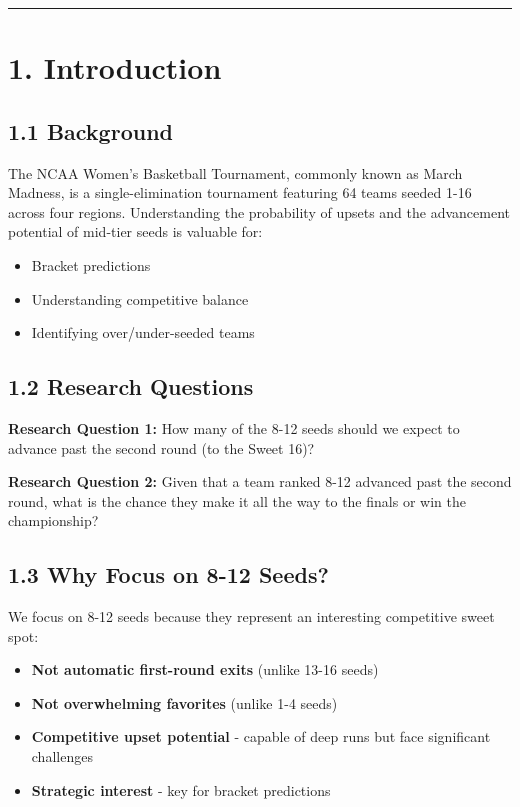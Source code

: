 \documentclass[
]{article}
\providecommand{\tightlist}{%
  \setlength{\itemsep}{0pt}\setlength{\parskip}{0pt}}
\begin{document}
\begin{center}\rule{0.5\linewidth}{0.5pt}\end{center}

\section{1. Introduction}\label{introduction}

\subsection{1.1 Background}\label{background}

The NCAA Women's Basketball Tournament, commonly known as March Madness,
is a single-elimination tournament featuring 64 teams seeded 1-16 across
four regions. Understanding the probability of upsets and the
advancement potential of mid-tier seeds is valuable for:

\begin{itemize}
\tightlist
\item
  Bracket predictions
\item
  Understanding competitive balance
\item
  Identifying over/under-seeded teams
\end{itemize}

\subsection{1.2 Research Questions}\label{research-questions}

\textbf{Research Question 1:} How many of the 8-12 seeds should we
expect to advance past the second round (to the Sweet 16)?

\textbf{Research Question 2:} Given that a team ranked 8-12 advanced
past the second round, what is the chance they make it all the way to
the finals or win the championship?

\subsection{1.3 Why Focus on 8-12 Seeds?}\label{why-focus-on-8-12-seeds}

We focus on 8-12 seeds because they represent an interesting competitive
sweet spot:

\begin{itemize}
\tightlist
\item
  \textbf{Not automatic first-round exits} (unlike 13-16 seeds)
\item
  \textbf{Not overwhelming favorites} (unlike 1-4 seeds)
\item
  \textbf{Competitive upset potential} - capable of deep runs but face
  significant challenges
\item
  \textbf{Strategic interest} - key for bracket predictions
\end{itemize}
\end{document}
